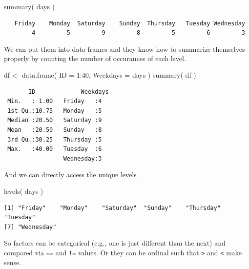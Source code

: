 \documentclass[
  letterpaper,
]{book}
\newenvironment{Shaded}{\begin{snugshade}}{\end{snugshade}}
\newcommand{\AttributeTok}[1]{\textcolor[rgb]{0.40,0.45,0.13}{#1}}
\newcommand{\DecValTok}[1]{\textcolor[rgb]{0.68,0.00,0.00}{#1}}
\newcommand{\FunctionTok}[1]{\textcolor[rgb]{0.28,0.35,0.67}{#1}}
\newcommand{\NormalTok}[1]{\textcolor[rgb]{0.00,0.23,0.31}{#1}}
\newcommand{\OtherTok}[1]{\textcolor[rgb]{0.00,0.23,0.31}{#1}}
\newcommand{\SpecialCharTok}[1]{\textcolor[rgb]{0.37,0.37,0.37}{#1}}
\begin{document}
\begin{Shaded}
\begin{Highlighting}[]
\FunctionTok{summary}\NormalTok{( days )}
\end{Highlighting}
\end{Shaded}

\begin{verbatim}
   Friday    Monday  Saturday    Sunday  Thursday   Tuesday Wednesday 
        4         5         9         8         5         6         3 
\end{verbatim}

We can put them into data frames and they know how to summarize
themselves properly by counting the number of occurances of each level.

\begin{Shaded}
\begin{Highlighting}[]
\NormalTok{df }\OtherTok{\textless{}{-}} \FunctionTok{data.frame}\NormalTok{( }\AttributeTok{ID =} \DecValTok{1}\SpecialCharTok{:}\DecValTok{40}\NormalTok{, }\AttributeTok{Weekdays =}\NormalTok{ days )}
\FunctionTok{summary}\NormalTok{( df )}
\end{Highlighting}
\end{Shaded}

\begin{verbatim}
       ID             Weekdays
 Min.   : 1.00   Friday   :4  
 1st Qu.:10.75   Monday   :5  
 Median :20.50   Saturday :9  
 Mean   :20.50   Sunday   :8  
 3rd Qu.:30.25   Thursday :5  
 Max.   :40.00   Tuesday  :6  
                 Wednesday:3  
\end{verbatim}

And we can directly access the unique levels

\begin{Shaded}
\begin{Highlighting}[]
\FunctionTok{levels}\NormalTok{( days )}
\end{Highlighting}
\end{Shaded}

\begin{verbatim}
[1] "Friday"    "Monday"    "Saturday"  "Sunday"    "Thursday"  "Tuesday"  
[7] "Wednesday"
\end{verbatim}

So factors can be categorical (e.g., one is just different than the
next) and compared via \texttt{==} and \texttt{!=} values. Or they can
be ordinal such that \texttt{\textgreater{}} and \texttt{\textless{}}
make sense.
\end{document}
